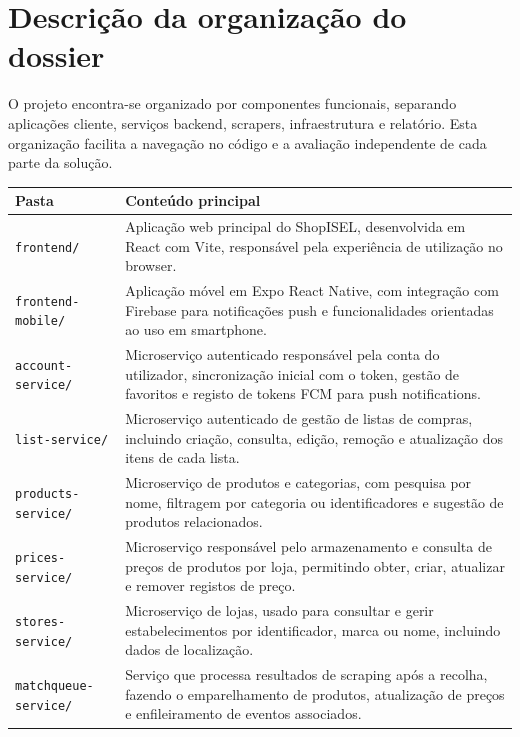 \documentclass[a4paper,11pt]{article}
\let\oldsection\section
\renewcommand{\section}{\Needspace{8\baselineskip}\oldsection}
\begin{document}
\section{Descri\c{c}\~ao da organiza\c{c}\~ao do dossier}

O projeto encontra-se organizado por componentes funcionais, separando aplica\c{c}\~oes cliente, servi\c{c}os backend, scrapers, infraestrutura e relat\'orio. Esta organiza\c{c}\~ao facilita a navega\c{c}\~ao no c\'odigo e a avalia\c{c}\~ao independente de cada parte da solu\c{c}\~ao.

\begin{longtable}{>{\raggedright\arraybackslash}p{4.5cm} >{\raggedright\arraybackslash}p{8.8cm}}
\textbf{Pasta} & \textbf{Conte\'udo principal} \\
\hline
\texttt{frontend/} & Aplica\c{c}\~ao web principal do ShopISEL, desenvolvida em React com Vite, respons\'avel pela experi\^encia de utiliza\c{c}\~ao no browser. \\
\texttt{frontend-mobile/} & Aplica\c{c}\~ao m\'ovel em Expo React Native, com integra\c{c}\~ao com Firebase para notifica\c{c}\~oes push e funcionalidades orientadas ao uso em smartphone. \\
\texttt{account-service/} & Microservi\c{c}o autenticado respons\'avel pela conta do utilizador, sincroniza\c{c}\~ao inicial com o token, gest\~ao de favoritos e registo de tokens FCM para push notifications. \\
\texttt{list-service/} & Microservi\c{c}o autenticado de gest\~ao de listas de compras, incluindo cria\c{c}\~ao, consulta, edi\c{c}\~ao, remo\c{c}\~ao e atualiza\c{c}\~ao dos itens de cada lista. \\
\texttt{products-service/} & Microservi\c{c}o de produtos e categorias, com pesquisa por nome, filtragem por categoria ou identificadores e sugest\~ao de produtos relacionados. \\
\texttt{prices-service/} & Microservi\c{c}o respons\'avel pelo armazenamento e consulta de pre\c{c}os de produtos por loja, permitindo obter, criar, atualizar e remover registos de pre\c{c}o. \\
\texttt{stores-service/} & Microservi\c{c}o de lojas, usado para consultar e gerir estabelecimentos por identificador, marca ou nome, incluindo dados de localiza\c{c}\~ao. \\
\texttt{matchqueue-service/} & Servi\c{c}o que processa resultados de scraping ap\'os a recolha, fazendo o emparelhamento de produtos, atualiza\c{c}\~ao de pre\c{c}os e enfileiramento de eventos associados. \\

\end{longtable}
\end{document}
